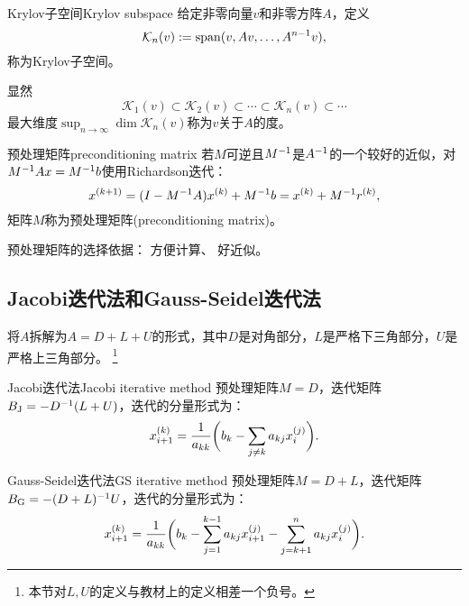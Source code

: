 \begin{definition}
    {Krylov子空间}{Krylov subspace}
    给定非零向量$v$和非零方阵$A$，定义
    \[
        \mathcal K_n(v):=\operatorname{span}(v,Av,\ldots,A^{n-1}v),
    \]
    称为Krylov子空间。
\end{definition}

\begin{corollary}
    显然
    \[
        \mathcal K_1(v)\subset\mathcal K_2(v)\subset\cdots\subset\mathcal K_n(v)\subset\cdots
    \]
    最大维度$\sup_{n\to\infty}\dim\mathcal K_n(v)$称为$v$关于$A$的度。
\end{corollary}

\begin{definition}
    {预处理矩阵}{preconditioning matrix}
    若$M$可逆且$M^{-1}$是$A^{-1}$的一个较好的近似，对$M^{-1} Ax=M^{-1} b$使用Richardson迭代：
    \begin{equation}
        x^{(k+1)}=(I-M^{-1} A)x^{(k)}+M^{-1} b=x^{(k)}+M^{-1} r^{(k)},
    \end{equation}
    矩阵$M$称为预处理矩阵(preconditioning matrix)。
\end{definition}

\begin{remark}
    预处理矩阵的选择依据：
    方便计算、
    好近似。
\end{remark}

\subsection{Jacobi迭代法和Gauss-Seidel迭代法}

将$A$拆解为$A=D+L+U$的形式，其中$D$是对角部分，$L$是严格下三角部分，$U$是严格上三角部分。
\footnote{本节对$L,U$的定义与教材上的定义相差一个负号。}

\begin{example}
    {Jacobi迭代法}{Jacobi iterative method}
    预处理矩阵$M=D$，迭代矩阵$B_\text J=-D^{-1}(L+U)$，迭代的分量形式为：
    \begin{equation}
        x_{i+1}^{(k)}=\frac1{a_{kk}}\biggl(b_k-\sum_{j\neq k}a_{kj}x_i^{(j)}\biggr).
    \end{equation}
\end{example}

\begin{example}
    {Gauss-Seidel迭代法}{GS iterative method}
    预处理矩阵$M=D+L$，迭代矩阵$B_\text G=-(D+L)^{-1} U$，迭代的分量形式为：
    \begin{equation}
        x_{i+1}^{(k)}=\frac1{a_{kk}}\biggl(b_k-\sum_{j=1}^{k-1}a_{kj}x_{i+1}^{(j)}-\sum_{j=k+1}^na_{kj}x_i^{(j)}\biggr).
    \end{equation}
\end{example}

